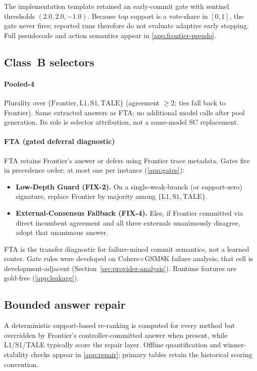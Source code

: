 The implementation template retained an early-commit gate with sentinel thresholds
$(2.0,2.0,-1.0)$. Because top support is a vote-share in $[0,1]$, the gate never fires; reported
runs therefore do not evaluate adaptive early stopping. Full pseudocode and action semantics appear
in \ref{app:frontier-pseudo}.

\subsection{Class~B selectors}
\label{sec:method-classb}

\paragraph{Pooled-4}
Plurality over $\{\mathrm{Frontier},\mathrm{L1},\mathrm{S1},\mathrm{TALE}\}$ (agreement $\geq 2$;
ties fall back to Frontier). Same extracted answers as FTA; no additional model calls after pool
generation. Its role is selector attribution, not a same-model SC replacement.

\paragraph{FTA (gated deferral diagnostic)}
FTA retains Frontier's answer or defers using Frontier trace metadata. Gates fire in precedence
order; at most one per instance (\ref{app:gates}):
\begin{itemize}
\item \textbf{Low-Depth Guard (FIX-2).} On a single-weak-branch (or support-zero) signature, replace
Frontier by majority among $\{\mathrm{L1},\mathrm{S1},\mathrm{TALE}\}$.
\item \textbf{External-Consensus Fallback (FIX-4).} Else, if Frontier committed via direct incumbent
agreement and all three externals unanimously disagree, adopt that unanimous answer.
\end{itemize}
FTA is the transfer diagnostic for failure-mined commit semantics, not a learned router. Gate rules
were developed on Cohere$\times$GSM8K failure analysis; that cell is development-adjacent
(Section~\ref{sec:provider-analysis}). Runtime features are gold-free (\ref{app:leakage}).

\subsection{Bounded answer repair}
\label{sec:method-scope}

A deterministic support-based re-ranking is computed for every method but overridden by Frontier's
controller-committed answer when present, while L1/S1/TALE typically score the repair layer. Offline
quantification and winner-stability checks appear in \ref{app:repair}; primary tables retain
the historical scoring convention.
